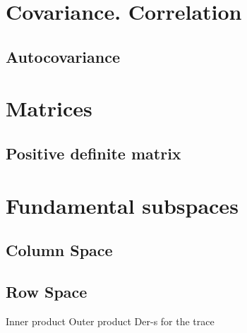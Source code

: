 \section*{Covariance. Correlation}
\subsection{Autocovariance}

\section{Matrices}
\subsection{Positive definite matrix}

\section{Fundamental subspaces}
\subsection{Column Space}
\subsection{Row Space}

Inner product
Outer product
Der-s for the trace